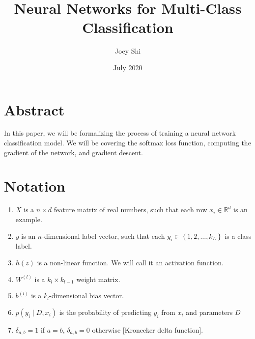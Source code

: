 \documentclass{article}
\title{Neural Networks for Multi-Class Classification}
\author{Joey Shi}
\date{July 2020}
\newcommand{\set}[1]{\left\{ #1 \right\}}   %
\newcommand{\R}{\mathbb{R}}                 %
\begin{document}
\maketitle

\section{Abstract}
In this paper, we will be formalizing the process of training a neural network classification model. We will be covering the softmax loss function, computing the gradient of the network, and gradient descent.

\vspace{1cm}

\section{Notation}
\begin{enumerate}
\item $X$ is a $n \times d$ feature matrix of real numbers, such that each row $x_i\in\R^d$ is an example.
\item $y$ is an $n$-dimensional label vector, such that each $y_i\in\set{1,2,\dots , k_L}$ is a class label.
\item $h(z)$ is a non-linear function. We will call it an activation function.
\item $W^{(l)}$ is a $k_{l} \times k_{l-1}$ weight matrix.
\item $b^{(l)}$ is a $k_{l}$-dimensional bias vector.
\item $p(y_i \mid D, x_i)$ is the probability of predicting $y_i$ from $x_i$ and parameters $D$
\item $\delta_{a, b} = 1$ if $a = b$, $\delta_{a, b} = 0$ otherwise [Kronecker delta function].
\end{enumerate}

\vspace{1cm}

\end{document}
